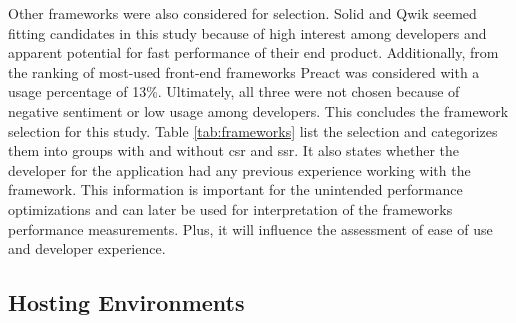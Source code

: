 \documentclass[a4paper, 12pt]{article}
\begin{document}
Other frameworks were also considered for selection.
Solid and Qwik seemed fitting candidates  in this study because of high interest among developers and apparent potential for fast performance of their end product.
Additionally, from the ranking of most-used front-end frameworks Preact was considered with a usage percentage of 13\%.
Ultimately, all three were not chosen because of negative sentiment or low usage among developers.
This concludes the framework selection for this study.
Table \ref{tab:frameworks} list the selection and categorizes them into groups with and without \acrshort{csr} and \acrshort{ssr}.
It also states whether the developer for the application had any previous experience working with the framework.
This information is important for the unintended performance optimizations and can later be used for interpretation of the frameworks performance measurements.
Plus, it will influence the assessment of ease of use and developer experience.

\subsection{Hosting Environments}\label{subsec:hostingenvironments}
% 
% 
\end{document}
